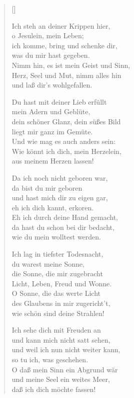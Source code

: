 \begin{multicols}{2}
\settowidth{\versewidth}{Nehmt weg das Stroh, nehmt weg das Heu,}
\begin{verse}[\versewidth]
 
 Ich steh an deiner Krippen hier,\\
o Jesulein, mein Leben;\\
ich komme, bring und schenke dir,\\
was du mir hast gegeben.\\
Nimm hin, es ist mein Geist und Sinn,\\
Herz, Seel und Mut, nimm alles hin\\
und laß dir's wohlgefallen.
 
 Du hast mit deiner Lieb erfüllt\\
mein Adern und Geblüte,\\
dein schöner Glanz, dein süßes Bild\\
liegt mir ganz im Gemüte.\\
Und wie mag es auch anders sein:\\
Wie könnt ich dich, mein Herzelein,\\
aus meinem Herzen lassen!
 
 Da ich noch nicht geboren war,\\
da bist du mir geboren\\
und hast mich dir zu eigen gar,\\
eh ich dich kannt, erkoren.\\
Eh ich durch deine Hand gemacht,\\
da hast du schon bei dir bedacht,\\
wie du mein wolltest werden.
 
 Ich lag in tiefster Todesnacht,\\
du warest meine Sonne,\\
die Sonne, die mir zugebracht\\
Licht, Leben, Freud und Wonne.\\
O Sonne, die das werte Licht\\
des Glaubens in mir zugericht't,\\
wie schön sind deine Strahlen!
 
 Ich sehe dich mit Freuden an\\
und kann mich nicht satt sehen,\\
und weil ich nun nicht weiter kann,\\
so tu ich, was geschehen.\\
O daß mein Sinn ein Abgrund wär\\
und meine Seel ein weites Meer,\\
daß ich dich möchte fassen!
 

\end{verse}
\end{multicols}
